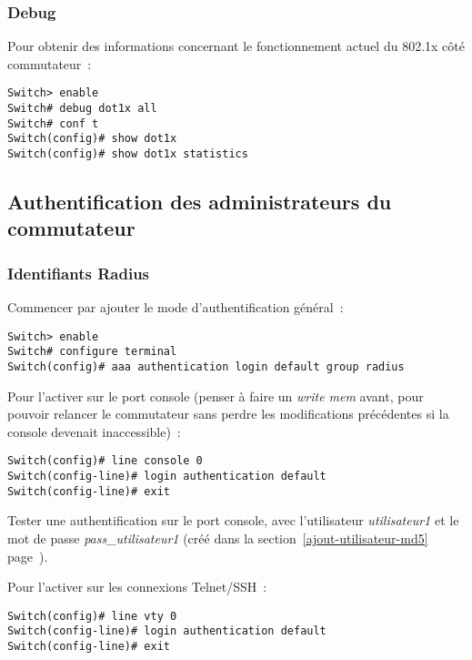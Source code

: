 \subsubsection{Debug}

Pour obtenir des informations concernant le fonctionnement actuel du 802.1x côté commutateur~:

\begin{lstlisting}
Switch> enable
Switch# debug dot1x all
Switch# conf t
Switch(config)# show dot1x
Switch(config)# show dot1x statistics
\end{lstlisting}

\subsection{Authentification des administrateurs du commutateur}
\subsubsection{Identifiants Radius}

Commencer par ajouter le mode d'authentification général~:

\begin{lstlisting}
Switch> enable
Switch# configure terminal
Switch(config)# aaa authentication login default group radius
\end{lstlisting}

Pour l'activer sur le port console (penser à faire un \emph{write mem} avant, pour pouvoir relancer le commutateur sans perdre les modifications précédentes si la console devenait inaccessible)~:

\begin{lstlisting}[morekeywords=0]
Switch(config)# line console 0
Switch(config-line)# login authentication default
Switch(config-line)# exit
\end{lstlisting}

Tester une authentification sur le port console, avec l'utilisateur \emph{utilisateur1} et le mot de passe \emph{pass\_utilisateur1} (créé dans la section~\ref{ajout-utilisateur-md5} page~\pageref{ajout-utilisateur-md5}). %

Pour l'activer sur les connexions Telnet/SSH~:

\begin{lstlisting}[morekeywords=0]
Switch(config)# line vty 0
Switch(config-line)# login authentication default
Switch(config-line)# exit
\end{lstlisting}

